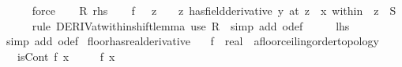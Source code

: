 \begin{isabellebody}
\ \ \ \ \isamarkupfalse%
\ force\isanewline
\ \ \isamarkupfalse%
\ R{\isacharcolon}{\kern0pt}\ {\isacharquery}{\kern0pt}rhs\isanewline
\ \ \isamarkupfalse%
\ {\isachardoublequoteopen}{\isacharparenleft}{\kern0pt}f\ {\isasymcirc}\ {\isacharparenleft}{\kern0pt}{\isacharplus}{\kern0pt}{\isacharparenright}{\kern0pt}\ z\ {\isasymcirc}\ {\isacharparenleft}{\kern0pt}{\isacharplus}{\kern0pt}{\isacharparenright}{\kern0pt}\ {\isacharparenleft}{\kern0pt}{\isacharminus}{\kern0pt}\ z{\isacharparenright}{\kern0pt}\ has{\isacharunderscore}{\kern0pt}field{\isacharunderscore}{\kern0pt}derivative\ y{\isacharparenright}{\kern0pt}\ {\isacharparenleft}{\kern0pt}at\ {\isacharparenleft}{\kern0pt}z\ {\isacharplus}{\kern0pt}\ x{\isacharparenright}{\kern0pt}\ within\ {\isacharparenleft}{\kern0pt}{\isacharplus}{\kern0pt}{\isacharparenright}{\kern0pt}\ z\ {\isacharbackquote}{\kern0pt}\ S{\isacharparenright}{\kern0pt}{\isachardoublequoteclose}\isanewline
\ \ \ \ \isamarkupfalse%
\ {\isacharparenleft}{\kern0pt}rule\ DERIV{\isacharunderscore}{\kern0pt}at{\isacharunderscore}{\kern0pt}within{\isacharunderscore}{\kern0pt}shift{\isacharunderscore}{\kern0pt}lemma{\isacharparenright}{\kern0pt}\ {\isacharparenleft}{\kern0pt}use\ R\ \ {\isacartoucheopen}simp\ add{\isacharcolon}{\kern0pt}\ o{\isacharunderscore}{\kern0pt}def{\isacartoucheclose}{\isacharparenright}{\kern0pt}\isanewline
\ \ \isamarkupfalse%
\ \isamarkupfalse%
\ {\isacharquery}{\kern0pt}lhs\isanewline
\ \ \ \ \isamarkupfalse%
\ {\isacharparenleft}{\kern0pt}simp\ add{\isacharcolon}{\kern0pt}\ o{\isacharunderscore}{\kern0pt}def{\isacharparenright}{\kern0pt}\isanewline
{}\isamarkupfalse%
%
\endisatagproof
{\isafoldproof}%
%
\isadelimproof
\isanewline
%
\endisadelimproof
\isanewline
{}\isamarkupfalse%
\ floor{\isacharunderscore}{\kern0pt}has{\isacharunderscore}{\kern0pt}real{\isacharunderscore}{\kern0pt}derivative{\isacharcolon}{\kern0pt}\isanewline
\ \ \ f\ {\isacharcolon}{\kern0pt}{\isacharcolon}{\kern0pt}\ {\isachardoublequoteopen}real\ {\isasymRightarrow}\ {\isacharprime}{\kern0pt}a{\isacharcolon}{\kern0pt}{\isacharcolon}{\kern0pt}{\isacharbraceleft}{\kern0pt}floor{\isacharunderscore}{\kern0pt}ceiling{\isacharcomma}{\kern0pt}order{\isacharunderscore}{\kern0pt}topology{\isacharbraceright}{\kern0pt}{\isachardoublequoteclose}\isanewline
\ \ \ {\isachardoublequoteopen}isCont\ f\ x{\isachardoublequoteclose}\isanewline
\ \ \ \ \ {\isachardoublequoteopen}f\ x\ {\isasymnotin}\ {\isasymint}{\isachardoublequoteclose}\isanewline

\end{isabellebody}
